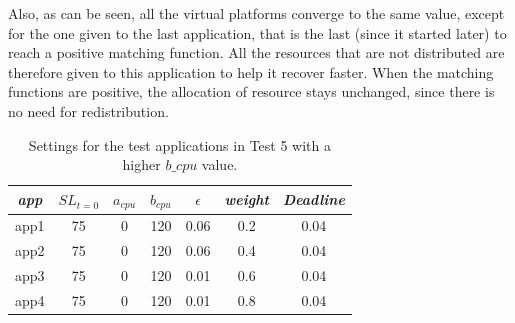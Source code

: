 \documentclass[nobiblatex]{LTHthesis}
\begin{document}
Also, as can be seen, all the virtual platforms converge to the same value,
except for the one given to the last application, that is the last 
(since it started later) to reach a positive matching function. 
All the resources that are not distributed are therefore given to this
application to help it recover faster. When the matching functions are
positive, the allocation of resource stays unchanged, since there is no need
for redistribution.

\begin{table}[h]
  \centering
  \begin{tabular}{|c|c|c|c|c|c|c|}
  \hline 
   \emph{app} & $SL_{t=0}$ & \textbf{$a_{cpu}$} & \textbf{$b_{cpu}$} & \textbf{$\epsilon$} & \emph{weight} & \emph{Deadline} \\ \hline
  app1 & 75 & 0 & 120 & 0.06 & 0.2 &0.04  \\ \hline
  app2 & 75 & 0 & 120 & 0.06 & 0.4 &0.04  \\ \hline
  app3 & 75 & 0 & 120 & 0.01 & 0.6 &0.04  \\ \hline
  app4 & 75 & 0 & 120 & 0.01 & 0.8 &0.04  \\ \hline		
  \end{tabular}
  \caption{Settings for the test applications in Test 5
	with a higher $b\_cpu$ value.}
  \label{tab:settings_test5b}
\end{table}
\end{document}
